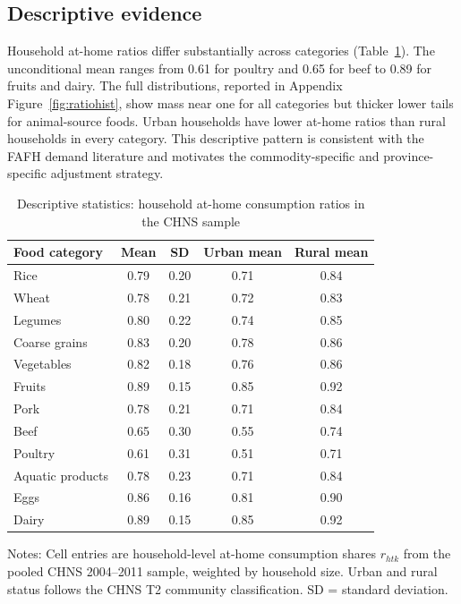 \documentclass[preprint,12pt,authoryear]{elsarticle}
\begin{document}
\subsection{Descriptive evidence}

Household at-home ratios differ substantially across categories (Table~\ref{tab:descriptives}). The unconditional mean ranges from 0.61 for poultry and 0.65 for beef to 0.89 for fruits and dairy. The full distributions, reported in Appendix Figure~\ref{fig:ratiohist}, show mass near one for all categories but thicker lower tails for animal-source foods. Urban households have lower at-home ratios than rural households in every category. This descriptive pattern is consistent with the FAFH demand literature and motivates the commodity-specific and province-specific adjustment strategy.

\begin{table}[htbp]
\centering
\begin{threeparttable}
\caption{Descriptive statistics: household at-home consumption ratios in the CHNS sample}
\label{tab:descriptives}
\small
\setlength{\tabcolsep}{12pt}
\begin{tabular}{lcccc}
\toprule
Food category & Mean & SD & Urban mean & Rural mean \\
\midrule
Rice             & 0.79 & 0.20 & 0.71 & 0.84 \\
Wheat            & 0.78 & 0.21 & 0.72 & 0.83 \\
Legumes          & 0.80 & 0.22 & 0.74 & 0.85 \\
Coarse grains    & 0.83 & 0.20 & 0.78 & 0.86 \\
Vegetables       & 0.82 & 0.18 & 0.76 & 0.86 \\
Fruits           & 0.89 & 0.15 & 0.85 & 0.92 \\
Pork             & 0.78 & 0.21 & 0.71 & 0.84 \\
Beef             & 0.65 & 0.30 & 0.55 & 0.74 \\
Poultry          & 0.61 & 0.31 & 0.51 & 0.71 \\
Aquatic products & 0.78 & 0.23 & 0.71 & 0.84 \\
Eggs             & 0.86 & 0.16 & 0.81 & 0.90 \\
Dairy            & 0.89 & 0.15 & 0.85 & 0.92 \\
\bottomrule
\end{tabular}
\begin{tablenotes}[flushleft]
\scriptsize
\item Notes: Cell entries are household-level at-home consumption shares $r_{htk}$ from the pooled CHNS 2004--2011 sample, weighted by household size. Urban and rural status follows the CHNS T2 community classification. SD = standard deviation.
\end{tablenotes}
\end{threeparttable}
\end{table}
\end{document}
